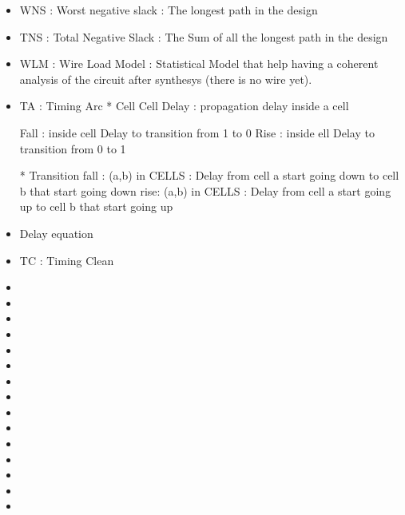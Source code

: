 \documentclass[11pt,a4paper,sans]{report}
\begin{document}
\begin{itemize}
	\item WNS : Worst negative slack : The longest path in the design
	\item TNS : Total Negative Slack : The Sum of all the longest path in the design
	\item WLM : Wire Load Model : Statistical Model that help having a coherent
		analysis of the circuit after synthesys (there is no wire yet).


	\item TA  : Timing Arc %
		* Cell
			Cell Delay : propagation delay inside a cell

			Fall : inside cell Delay to transition from 1 to 0
			Rise : inside ell Delay to transition from 0 to 1

		* Transition
			fall : (a,b) in CELLS :
				Delay from cell a start going down to cell b that start going down
			rise: (a,b) in CELLS :
				Delay from cell a start going up to cell b that start going up

	\item Delay equation %
	\item TC  : Timing Clean %

	\item 
	\item 
	\item 
	\item 
	\item 
	\item 
	\item 
	\item 
	\item 
	\item 
	\item 
	\item 
	\item 
	\item 
	\item 
\end{itemize}
\end{document}
